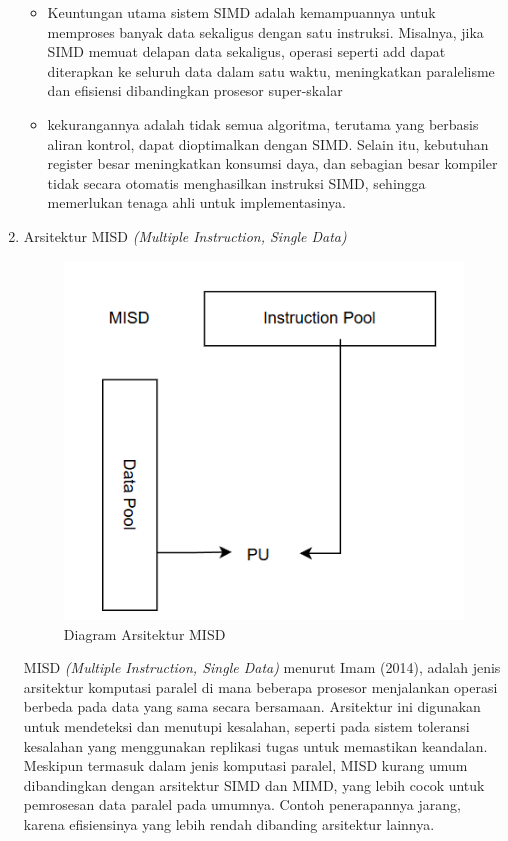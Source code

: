 \documentclass[12pt]{article}
\begin{document}
\begin{enumerate}
    \begin{itemize}
        \item Keuntungan utama sistem SIMD adalah kemampuannya untuk memproses banyak data sekaligus dengan satu instruksi. Misalnya, jika SIMD memuat delapan data sekaligus, operasi seperti add dapat diterapkan ke seluruh data dalam satu waktu, meningkatkan paralelisme dan efisiensi dibandingkan prosesor super-skalar
        \item kekurangannya adalah tidak semua algoritma, terutama yang berbasis aliran kontrol, dapat dioptimalkan dengan SIMD. Selain itu, kebutuhan register besar meningkatkan konsumsi daya, dan sebagian besar kompiler tidak secara otomatis menghasilkan instruksi SIMD, sehingga memerlukan tenaga ahli untuk implementasinya.
    \end{itemize}

    \item Arsitektur MISD \textit{(Multiple Instruction, Single Data)}

        \noindent
        \begin{figure}[H]
            \centering
            \includegraphics[width=0.4\linewidth]{asset/image8.png}
            \caption{Diagram Arsitektur MISD}
            \label{fig:Diagram-Arsitektur-MISD}
        \end{figure}

    MISD \textit{(Multiple Instruction, Single Data)}  menurut Imam (2014), adalah jenis arsitektur komputasi paralel di mana beberapa prosesor menjalankan operasi berbeda pada data yang sama secara bersamaan. Arsitektur ini digunakan untuk mendeteksi dan menutupi kesalahan, seperti pada sistem toleransi kesalahan yang menggunakan replikasi tugas untuk memastikan keandalan. Meskipun termasuk dalam jenis komputasi paralel, MISD kurang umum dibandingkan dengan arsitektur SIMD dan MIMD, yang lebih cocok untuk pemrosesan data paralel pada umumnya. Contoh penerapannya jarang, karena efisiensinya yang lebih rendah dibanding arsitektur lainnya.


\end{enumerate}
\end{document}
